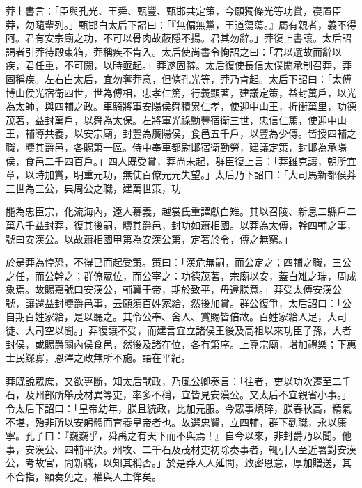 \begin{pinyinscope}
莽上書言：「臣與孔光、王舜、甄豐、甄邯共定策，今願獨條光等功賞，寑置臣莽，勿隨輩列。」甄邯白太后下詔曰：「『無偏無黨，王道蕩蕩。』屬有親者，義不得阿。君有安宗廟之功，不可以骨肉故蔽隱不揚。君其勿辭。」莽復上書讓。太后詔謁者引莽待殿東箱，莽稱疾不肯入。太后使尚書令恂詔之曰：「君以選故而辭以疾，君任重，不可闕，以時亟起。」莽遂固辭。太后復使長信太僕閎承制召莽，莽固稱疾。左右白太后，宜勿奪莽意，但條孔光等，莽乃肯起。太后下詔曰：「太傅博山侯光宿衛四世，世為傅相，忠孝仁篤，行義顯著，建議定策，益封萬戶，以光為太師，與四輔之政。車騎將軍安陽侯舜積累仁孝，使迎中山王，折衝萬里，功德茂著，益封萬戶，以舜為太保。左將軍光祿勳豐宿衛三世，忠信仁篤，使迎中山王，輔導共養，以安宗廟，封豐為廣陽侯，食邑五千戶，以豐為少傅。皆授四輔之職，疇其爵邑，各賜第一區。侍中奉車都尉邯宿衛勤勞，建議定策，封邯為承陽侯，食邑二千四百戶。」四人既受賞，莽尚未起，群臣復上言：「莽雖克讓，朝所宜章，以時加賞，明重元功，無使百僚元元失望。」太后乃下詔曰：「大司馬新都侯莽三世為三公，典周公之職，建萬世策，功

能為忠臣宗，化流海內，遠人慕義，越裳氏重譯獻白雉。其以召陵、新息二縣戶二萬八千益封莽，復其後嗣，疇其爵邑，封功如蕭相國。以莽為太傅，幹四輔之事，號曰安漢公。以故蕭相國甲第為安漢公第，定著於令，傳之無窮。」

於是莽為惶恐，不得已而起受策。策曰：「漢危無嗣，而公定之；四輔之職，三公之任，而公幹之；群僚眾位，而公宰之：功德茂著，宗廟以安，蓋白雉之瑞，周成象焉。故賜嘉號曰安漢公，輔翼于帝，期於致平，毋違朕意。」莽受太傅安漢公號，讓還益封疇爵邑事，云願須百姓家給，然後加賞。群公復爭，太后詔曰：「公自期百姓家給，是以聽之。其令公奉、舍人、賞賜皆倍故。百姓家給人足，大司徒、大司空以聞。」莽復讓不受，而建言宜立諸侯王後及高祖以來功臣子孫，大者封侯，或賜爵關內侯食邑，然後及諸在位，各有第序。上尊宗廟，增加禮樂；下惠士民鰥寡，恩澤之政無所不施。語在平紀。

莽既說眾庶，又欲專斷，知太后猒政，乃風公卿奏言：「往者，吏以功次遷至二千石，及州部所舉茂材異等吏，率多不稱，宜皆見安漢公。又太后不宜親省小事。」令太后下詔曰：「皇帝幼年，朕且統政，比加元服。今眾事煩碎，朕春秋高，精氣不堪，殆非所以安躬體而育養皇帝者也。故選忠賢，立四輔，群下勸職，永以康寧。孔子曰：『巍巍乎，舜禹之有天下而不與焉！』自今以來，非封爵乃以聞。他事，安漢公、四輔平決。州牧、二千石及茂材吏初除奏事者，輒引入至近署對安漢公，考故官，問新職，以知其稱否。」於是莽人人延問，致密恩意，厚加贈送，其不合指，顯奏免之，權與人主侔矣。


\end{pinyinscope}
